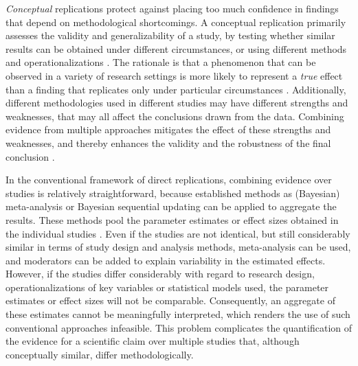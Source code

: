\documentclass[
  authoryear,
  preprint,
  5p,
  twocolumn]{elsarticle}
\begin{document}
\emph{Conceptual} replications protect against placing too much
confidence in findings that depend on methodological shortcomings. A
conceptual replication primarily assesses the validity and
generalizability of a study, by testing whether similar results can be
obtained under different circumstances, or using different methods and
operationalizations \citep{nosek_scientific_2012}. The rationale is that
a phenomenon that can be observed in a variety of research settings is
more likely to represent a \emph{true} effect than a finding that
replicates only under particular circumstances
\citep{crandall_conceptual_2016}. Additionally, different methodologies
used in different studies may have different strengths and weaknesses,
that may all affect the conclusions drawn from the data. Combining
evidence from multiple approaches mitigates the effect of these
strengths and weaknesses, and thereby enhances the validity and the
robustness of the final conclusion
\citep{lawlor_triangulation_2017, lipton2003inference, mathison1988triangulate, munafo_robust_2018, nosek_scientific_2012}.

In the conventional framework of direct replications, combining evidence
over studies is relatively straightforward, because established methods
as (Bayesian) meta-analysis
\citep{lipsey_wilson_2001, sutton_bayesian_meta2001} or Bayesian
sequential updating \citep{schonbrodt_sequential_2017} can be applied to
aggregate the results. These methods pool the parameter estimates or
effect sizes obtained in the individual studies
\citep{cooper_handbook_2009}. Even if the studies are not identical, but
still considerably similar in terms of study design and analysis
methods, meta-analysis can be used, and moderators can be added to
explain variability in the estimated effects. However, if the studies
differ considerably with regard to research design, operationalizations
of key variables or statistical models used, the parameter estimates or
effect sizes will not be comparable. Consequently, an aggregate of these
estimates cannot be meaningfully interpreted, which renders the use of
such conventional approaches infeasible. This problem complicates the
quantification of the evidence for a scientific claim over multiple
studies that, although conceptually similar, differ methodologically.
\end{document}
